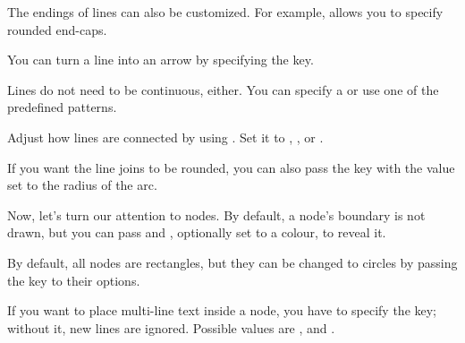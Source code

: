 The endings of lines can also be customized. For
example,  allows you to specify rounded
end-caps.
\begin{example}
\end{example}
You can turn a line into an arrow by specifying the  key.
\begin{example}
\end{example}

Lines do not need to be continuous, either. You can specify a  or use one of the predefined patterns.
\begin{example}
\end{example}

Adjust how lines are connected by using
. Set it to , , or
.
\begin{example}
\end{example}
If you want the line joins to be rounded, you can also pass the  key with the value set to the radius of the arc.
\begin{example}
\end{example}

Now, let's turn our attention to nodes. By default, a node's boundary is not
drawn, but you can pass  and , optionally set to a
colour, to reveal it.
\begin{example}
\end{example}
By default, all nodes are rectangles, but they can be changed to circles by
passing the  key to their options.
\begin{example}
\end{example}

If you want to place multi-line text inside a node, you have to specify the
 key; without it, new lines are ignored. Possible values %
are ,  and .
\begin{example}
\end{example}

